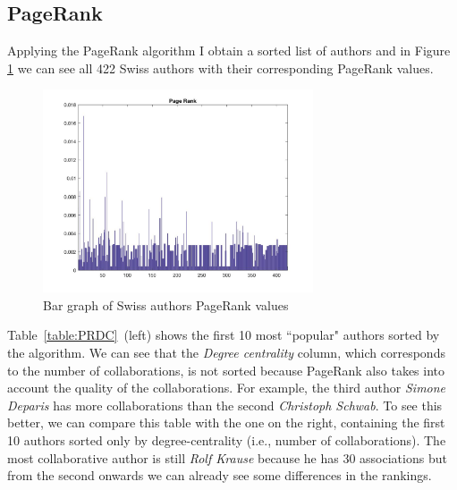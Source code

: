 \documentclass[]{usiinfbachelorproject}
\begin{document}
\subsection{PageRank}
Applying the PageRank algorithm I obtain a sorted list of authors and in Figure \ref{fig:pagerank_bars} we can see all 422 Swiss authors with their corresponding PageRank values. 

\begin{figure}[tb]
	\centering
	\includegraphics[height=6cm]{img/Analysis/page_rank_bars.jpg}
	\caption{ Bar graph of Swiss authors PageRank values}
	\label{fig:pagerank_bars}
\end{figure}

Table~\ref{table:PRDC}~(left) shows the first 10 most ``popular" authors sorted by the algorithm.
We can see that the \textit{Degree centrality} column, which corresponds to the number of collaborations, is not sorted because PageRank also takes into account the quality of the collaborations.
For example, the third author \textit{Simone Deparis} has more collaborations than the second \textit{Christoph Schwab}.
To see this better, we can compare this table with the one on the right, containing the first 10 authors sorted only by degree-centrality (i.e., number of collaborations). The most collaborative author is still \textit{Rolf Krause} because he has 30 associations but from the second onwards we can already see some differences in the rankings.
\end{document}
